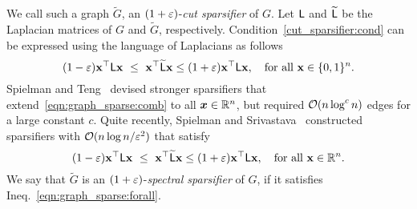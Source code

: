 %
We call such a graph $\widetilde{G}$, an $(1+\varepsilon)$-\emph{cut sparsifier} of $G$. Let ${\mathsf{L} }$ and $\widetilde{{\mathsf{L} }}$ be the Laplacian matrices of $G$ and $\widetilde{G}$, respectively. Condition~\eqref{cut_sparsifier:cond} can be expressed using the language of Laplacians as follows
%
\begin{equation}\label{eqn:graph_sparse:comb}
(1-\varepsilon) \mathbf{x}^\top {\ensuremath{\mathsf{L} }} \mathbf{x} \ \leq\ \mathbf{x}^\top \widetilde{{\mathsf{L} }} \mathbf{x} \leq (1+\varepsilon) \mathbf{x}^\top {\ensuremath{\mathsf{L} }} \mathbf{x}, \quad \text{for all }\mathbf{x}\in{\{0,1\}^n}.
\end{equation}
%
Spielman and Teng~\cite{graph:sparsifiers:SpielmanT08} devised stronger sparsifiers that extend~\eqref{eqn:graph_sparse:comb} to all $\bm{x}\in\mathbb{R}^n$, but required $\mathcal{O}(n\log^c n)$ edges for a large constant $c$. Quite recently, Spielman and Srivastava~\cite{graph:sparsifiers:eff_resistance} constructed sparsifiers with $\mathcal{O}(n\log n /\varepsilon^2)$ that satisfy
%
\begin{equation}\label{eqn:graph_sparse:forall}
(1-\varepsilon) \mathbf{x}^\top {\ensuremath{\mathsf{L} }} \mathbf{x} \ \leq\ \mathbf{x}^\top \widetilde{{\mathsf{L} }} \mathbf{x} \leq (1+\varepsilon) \mathbf{x}^\top {\ensuremath{\mathsf{L} }} \mathbf{x}, \quad \text{for all }\mathbf{x}\in\mathbb{R}^n.
\end{equation}
%
We say that $\widetilde{G}$ is an $(1+\varepsilon)$-\emph{spectral sparsifier} of $G$, if it satisfies Ineq.~\eqref{eqn:graph_sparse:forall}.
%

